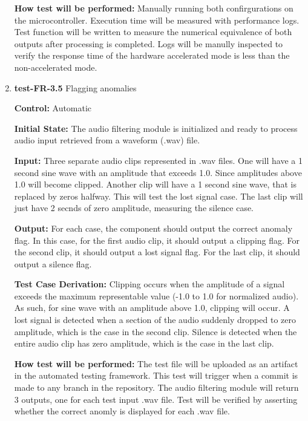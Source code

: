 \documentclass[12pt, titlepage]{article}
\begin{document}
\begin{enumerate}
\textbf{How test will be performed:}
Manually running both confirgurations on the microcontroller. Execution time 
will be measured with performance logs. Test function will be written to 
measure the numerical equivalence of both outputs after processing is 
completed. Logs will be manully inspected to verify the response time of the 
hardware accelerated mode is less than the non-accelerated mode.

\item{\textbf{test-FR-3.5} Flagging anomalies\\}

\textbf{Control:} Automatic
					
\textbf{Initial State:} 
The audio filtering module is initialized and ready to process audio input 
retrieved from a waveform (.wav) file. 
					
\textbf{Input:}
Three separate audio clips represented in .wav files. One will have a 1 second 
sine wave with an amplitude that exceeds 1.0. Since amplitudes above 1.0 will 
become clipped. Another clip will have a 1 second sine wave, that is replaced 
by zeros halfway. This will test the lost signal case. The last clip will just 
have 2 secnds of zero amplitude, measuring the silence case. 
					
\textbf{Output:}
For each case, the component should output the correct anomaly flag. In this 
case, for the first audio clip, it should output a clipping flag. For the 
second clip, it should output a lost signal flag. For the last clip, it should
 output a silence flag.

\textbf{Test Case Derivation:} 
Clipping occurs when the amplitude of a signal exceeds the maximum 
representable value (-1.0 to 1.0 for normalized audio). As such, for sine wave 
with an amplitude above 1.0, clipping will occur. A lost signal is detected 
when a section of the audio suddenly dropped to zero amplitude, which is the 
case in the second clip. Silence is detected when the entire audio clip has 
zero amplitude, which is the case in the last clip.

\textbf{How test will be performed:}
The test file will be uploaded as an artifact in the automated testing 
framework. This test will trigger when a commit is made to any branch in the 
repository. The audio filtering module will return 3 outputs, one for each test 
input .wav file. Test will be verified by asserting whether the correct anomly 
is displayed for each .wav file. 

\end{enumerate}
\end{document}
